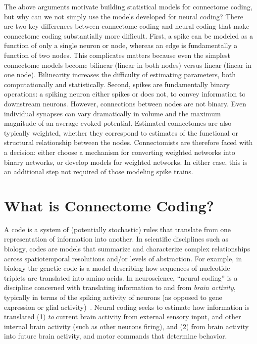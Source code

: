 \documentclass[11pt]{article}
\begin{document}
The above arguments motivate building statistical models for connectome coding, but why can we not simply use the models developed for neural coding?
There are two key differences between connectome coding and neural coding that make connectome coding substantially more difficult. 
First, a spike can be modeled as a function of only a single neuron or node, whereas an edge is fundamentally a function of two nodes.  This complicates matters because even the simplest connectome models become bilinear (linear in both nodes) versus linear (linear in one node).  Bilinearity increases the difficulty of estimating parameters, both computationally and statistically. Second, spikes are fundamentally binary operations: a spiking neuron either spikes or does not, to convey information to downstream neurons.  However, connections between nodes are not binary.  Even individual synapses can vary dramatically in volume and the maximum magnitude of an average evoked potential.  
Estimated connectomes are also typically weighted, whether  they correspond to estimates of the functional or structural relationship between the nodes. Connectomists are therefore faced with a decision: either choose a mechanism for converting weighted networks into binary networks, or develop models for weighted networks.  In either case, this is an additional step not required of those modeling spike trains. 





\section{What is Connectome Coding?}



A code is a system of (potentially stochastic) rules that translate from one representation of information into another.  In  scientific disciplines such as biology, codes are models that  summarize and characterize complex relationships across spatiotemporal resolutions and/or levels of abstraction.  For example, in biology the genetic code is a model describing how sequences of nucleotide triplets are translated into amino acids.  In neuroscience,  ``neural coding'' is a discipline  concerned with translating information to and from \emph{brain activity}, typically  in terms of the spiking activity of neurons (as opposed to  gene expression or glial activity)~\cite{Brown2004-fz}.  
Neural coding seeks to estimate how information is translated (1) \emph{to} current brain activity  from  external  sensory input, and other internal brain activity (such as other neurons firing), 
and (2) from  brain activity into future brain activity, and motor commands that determine  behavior.  
\end{document}
